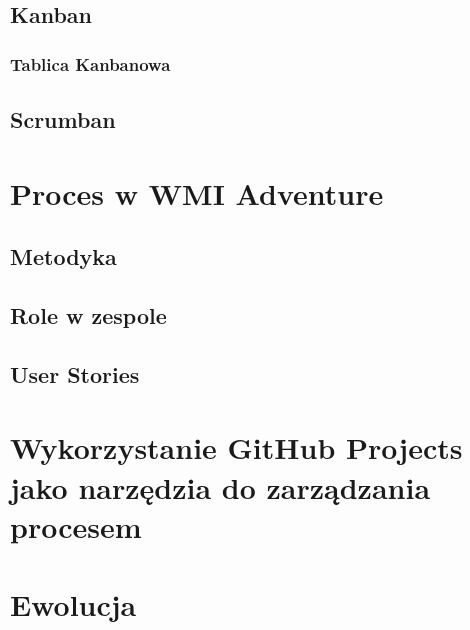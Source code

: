 \documentclass{article}
\begin{document}
\subsection{Kanban}
\subsubsection{Tablica Kanbanowa}

\subsection{Scrumban}

\section{Proces w WMI Adventure}

\subsection{Metodyka}
\subsection{Role w zespole}
\subsection{User Stories}

\section{Wykorzystanie GitHub Projects jako narzędzia do zarządzania procesem}

\section{Ewolucja}
\end{document}
